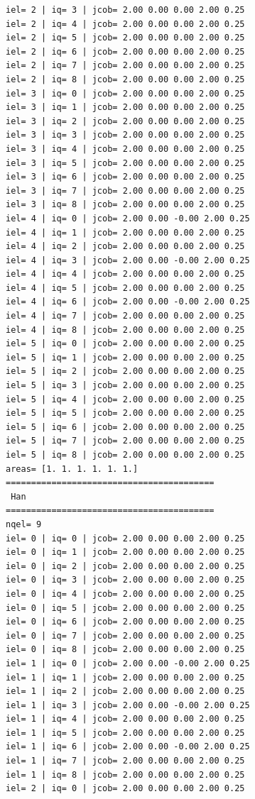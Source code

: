 \begin{tiny}
\begin{verbatim}
iel= 2 | iq= 3 | jcob= 2.00 0.00 0.00 2.00 0.25
iel= 2 | iq= 4 | jcob= 2.00 0.00 0.00 2.00 0.25
iel= 2 | iq= 5 | jcob= 2.00 0.00 0.00 2.00 0.25
iel= 2 | iq= 6 | jcob= 2.00 0.00 0.00 2.00 0.25
iel= 2 | iq= 7 | jcob= 2.00 0.00 0.00 2.00 0.25
iel= 2 | iq= 8 | jcob= 2.00 0.00 0.00 2.00 0.25
iel= 3 | iq= 0 | jcob= 2.00 0.00 0.00 2.00 0.25
iel= 3 | iq= 1 | jcob= 2.00 0.00 0.00 2.00 0.25
iel= 3 | iq= 2 | jcob= 2.00 0.00 0.00 2.00 0.25
iel= 3 | iq= 3 | jcob= 2.00 0.00 0.00 2.00 0.25
iel= 3 | iq= 4 | jcob= 2.00 0.00 0.00 2.00 0.25
iel= 3 | iq= 5 | jcob= 2.00 0.00 0.00 2.00 0.25
iel= 3 | iq= 6 | jcob= 2.00 0.00 0.00 2.00 0.25
iel= 3 | iq= 7 | jcob= 2.00 0.00 0.00 2.00 0.25
iel= 3 | iq= 8 | jcob= 2.00 0.00 0.00 2.00 0.25
iel= 4 | iq= 0 | jcob= 2.00 0.00 -0.00 2.00 0.25
iel= 4 | iq= 1 | jcob= 2.00 0.00 0.00 2.00 0.25
iel= 4 | iq= 2 | jcob= 2.00 0.00 0.00 2.00 0.25
iel= 4 | iq= 3 | jcob= 2.00 0.00 -0.00 2.00 0.25
iel= 4 | iq= 4 | jcob= 2.00 0.00 0.00 2.00 0.25
iel= 4 | iq= 5 | jcob= 2.00 0.00 0.00 2.00 0.25
iel= 4 | iq= 6 | jcob= 2.00 0.00 -0.00 2.00 0.25
iel= 4 | iq= 7 | jcob= 2.00 0.00 0.00 2.00 0.25
iel= 4 | iq= 8 | jcob= 2.00 0.00 0.00 2.00 0.25
iel= 5 | iq= 0 | jcob= 2.00 0.00 0.00 2.00 0.25
iel= 5 | iq= 1 | jcob= 2.00 0.00 0.00 2.00 0.25
iel= 5 | iq= 2 | jcob= 2.00 0.00 0.00 2.00 0.25
iel= 5 | iq= 3 | jcob= 2.00 0.00 0.00 2.00 0.25
iel= 5 | iq= 4 | jcob= 2.00 0.00 0.00 2.00 0.25
iel= 5 | iq= 5 | jcob= 2.00 0.00 0.00 2.00 0.25
iel= 5 | iq= 6 | jcob= 2.00 0.00 0.00 2.00 0.25
iel= 5 | iq= 7 | jcob= 2.00 0.00 0.00 2.00 0.25
iel= 5 | iq= 8 | jcob= 2.00 0.00 0.00 2.00 0.25
areas= [1. 1. 1. 1. 1. 1.]
=========================================
 Han
=========================================
nqel= 9
iel= 0 | iq= 0 | jcob= 2.00 0.00 0.00 2.00 0.25
iel= 0 | iq= 1 | jcob= 2.00 0.00 0.00 2.00 0.25
iel= 0 | iq= 2 | jcob= 2.00 0.00 0.00 2.00 0.25
iel= 0 | iq= 3 | jcob= 2.00 0.00 0.00 2.00 0.25
iel= 0 | iq= 4 | jcob= 2.00 0.00 0.00 2.00 0.25
iel= 0 | iq= 5 | jcob= 2.00 0.00 0.00 2.00 0.25
iel= 0 | iq= 6 | jcob= 2.00 0.00 0.00 2.00 0.25
iel= 0 | iq= 7 | jcob= 2.00 0.00 0.00 2.00 0.25
iel= 0 | iq= 8 | jcob= 2.00 0.00 0.00 2.00 0.25
iel= 1 | iq= 0 | jcob= 2.00 0.00 -0.00 2.00 0.25
iel= 1 | iq= 1 | jcob= 2.00 0.00 0.00 2.00 0.25
iel= 1 | iq= 2 | jcob= 2.00 0.00 0.00 2.00 0.25
iel= 1 | iq= 3 | jcob= 2.00 0.00 -0.00 2.00 0.25
iel= 1 | iq= 4 | jcob= 2.00 0.00 0.00 2.00 0.25
iel= 1 | iq= 5 | jcob= 2.00 0.00 0.00 2.00 0.25
iel= 1 | iq= 6 | jcob= 2.00 0.00 -0.00 2.00 0.25
iel= 1 | iq= 7 | jcob= 2.00 0.00 0.00 2.00 0.25
iel= 1 | iq= 8 | jcob= 2.00 0.00 0.00 2.00 0.25
iel= 2 | iq= 0 | jcob= 2.00 0.00 0.00 2.00 0.25

\end{verbatim}
\end{tiny}
